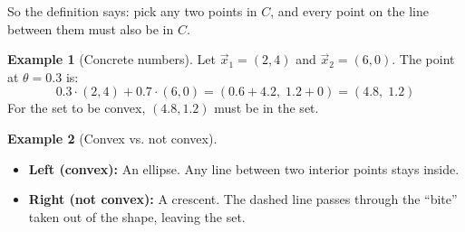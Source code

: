 \documentclass[10pt]{article}
\theoremstyle{definition}
\newtheorem{example}{Example}
\theoremstyle{plain}
\begin{document}
So the definition says: pick any two points in $C$, and every point on the line between them must also be in $C$.

\begin{example}[Concrete numbers]
Let $\vec{x}_1 = (2, 4)$ and $\vec{x}_2 = (6, 0)$. The point at $\theta = 0.3$ is:
\[
    0.3 \cdot (2,4) + 0.7 \cdot (6,0) = (0.6 + 4.2, \; 1.2 + 0) = (4.8, \; 1.2)
\]
For the set to be convex, $(4.8, 1.2)$ must be in the set.
\end{example}

\begin{example}[Convex vs. not convex]
\mbox{}

\begin{center}
\end{center}

\begin{itemize}
    \item \textbf{Left (convex):} An ellipse. Any line between two interior points stays inside.
    \item \textbf{Right (not convex):} A crescent. The dashed line passes through the ``bite'' taken out of the shape, leaving the set.
\end{itemize}
\end{example}
\end{document}
